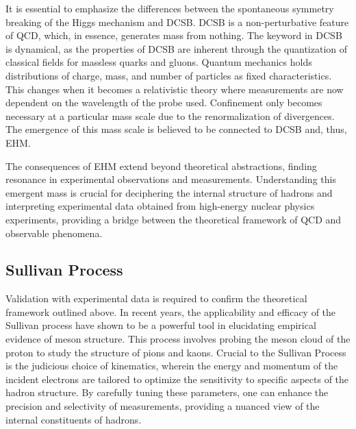 \documentclass[
]{report}
\begin{document}
It is essential to emphasize the differences between the spontaneous
symmetry breaking of the Higgs mechanism and DCSB. DCSB is a
non-perturbative feature of QCD, which, in essence, generates mass from
nothing. The keyword in DCSB is dynamical, as the properties of DCSB are
inherent through the quantization of classical fields for massless
quarks and gluons. Quantum mechanics holds distributions of charge,
mass, and number of particles as fixed characteristics. This changes
when it becomes a relativistic theory where measurements are now
dependent on the wavelength of the probe used. Confinement only becomes
necessary at a particular mass scale due to the renormalization of
divergences. The emergence of this mass scale is believed to be
connected to DCSB and, thus, EHM.

The consequences of EHM extend beyond theoretical abstractions, finding
resonance in experimental observations and measurements. Understanding
this emergent mass is crucial for deciphering the internal structure of
hadrons and interpreting experimental data obtained from high-energy
nuclear physics experiments, providing a bridge between the theoretical
framework of QCD and observable phenomena.

\hypertarget{sullivan-process}{%
\subsection{Sullivan Process}\label{sullivan-process}}

Validation with experimental data is required to confirm the theoretical
framework outlined above. In recent years, the applicability and
efficacy of the Sullivan process have shown to be a powerful tool in
elucidating empirical evidence of meson structure. This process involves
probing the meson cloud of the proton to study the structure of pions
and kaons. Crucial to the Sullivan Process is the judicious choice of
kinematics, wherein the energy and momentum of the incident electrons
are tailored to optimize the sensitivity to specific aspects of the
hadron structure. By carefully tuning these parameters, one can enhance
the precision and selectivity of measurements, providing a nuanced view
of the internal constituents of hadrons.
\end{document}
